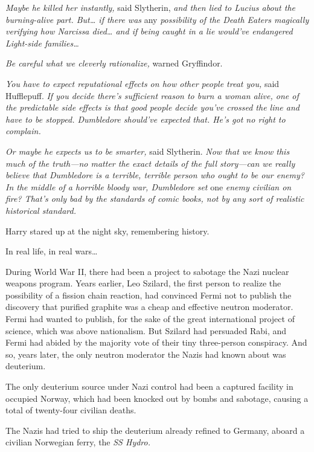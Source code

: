 \emph{Maybe he killed her instantly,} said Slytherin, \emph{and then lied to 
Lucius about the burning-alive part. But{\ldots} if there was} any 
\emph{possibility of the Death Eaters magically verifying how Narcissa 
died{\ldots} and if being caught in a lie would've endangered Light-side 
families{\ldots}}

\emph{Be careful what we cleverly rationalize,} warned Gryffindor.

\emph{You have to expect reputational effects on how other people treat you,} 
said Hufflepuff. \emph{If you decide there's sufficient reason to burn a woman 
alive, one of the predictable side effects is that good people decide you've 
crossed the line and have to be stopped. Dumbledore should've expected that. 
He's got no right to complain.}

\emph{Or maybe he expects us to be smarter,} said Slytherin. \emph{Now that we 
know this much of the truth---no matter the exact details of the full 
story---can we really believe that Dumbledore is a terrible, terrible person 
who ought to be our enemy? In the middle of a horrible bloody war, Dumbledore 
set} one \emph{enemy civilian on fire? That's only bad by the standards of 
comic books, not by any sort of realistic historical standard.}

Harry stared up at the night sky, remembering history.

In real life, in real wars{\ldots}

During World War II, there had been a project to sabotage the Nazi nuclear 
weapons program. Years earlier, Leo Szilard, the first person to realize the 
possibility of a fission chain reaction, had convinced Fermi not to publish the 
discovery that purified graphite was a cheap and effective neutron moderator. 
Fermi had wanted to publish, for the sake of the great international project of 
science, which was above nationalism. But Szilard had persuaded Rabi, and Fermi 
had abided by the majority vote of their tiny three-person conspiracy. And so, 
years later, the only neutron moderator the Nazis had known about was deuterium.

The only deuterium source under Nazi control had been a captured facility in 
occupied Norway, which had been knocked out by bombs and sabotage, causing a 
total of twenty-four civilian deaths.

The Nazis had tried to ship the deuterium already refined to Germany, aboard a 
civilian Norwegian ferry, the \emph{SS Hydro.}

